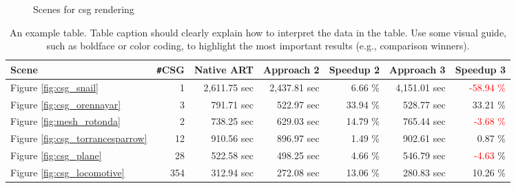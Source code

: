 \begin{figure}
	\hfill
	\hfill
	
	\caption{Scenes for csg rendering}
	\label{fig:csg_figures}
\end{figure}

\begin{table}
	\centering
	{\footnotesize\sf
		\begin{tabular}{lrrrrrr}
			\toprule
			Scene & \Verb!#!CSG & Native ART & Approach 2 & Speedup 2 & Approach 3 & Speedup 3 \\ 
			\midrule
			Figure \ref{fig:csg_snail} & 1 & 2,611.75 sec & 2,437.81 sec & 6.66 \% & 4,151.01 sec & \textcolor{red}{-58.94 \%}  \\
			Figure \ref{fig:csg_orennayar} & 3 & 791.71 sec & 522.97 sec & 33.94 \% & 528.77 sec & 33.21 \% \\
			Figure \ref{fig:mesh_rotonda} & 2 & 738.25 sec & 629.03 sec & 14.79 \% & 765.44 sec & \textcolor{red}{-3.68 \%}  \\
			\addlinespace %
			Figure \ref{fig:csg_torrancesparrow} & 12 & 910.56 sec & 896.97 sec & 1.49 \% & 902.61 sec & 0.87 \% \\
			Figure \ref{fig:csg_plane} & 28 & 522.58 sec & 498.25 sec & 4.66 \% & 546.79 sec & \textcolor{red}{-4.63} \% \\
			Figure \ref{fig:csg_locomotive} & 354 & 312.94 sec & 272.08 sec & 13.06 \% & 280.83 sec & 10.26 \% \\
			\bottomrule
	\end{tabular}}
	\caption{An example table. Table caption should clearly explain how to interpret the data in the table. Use some visual guide, such as boldface or color coding, to highlight the most important results (e.g., comparison winners).}
	\label{tab:csg}
\end{table}



